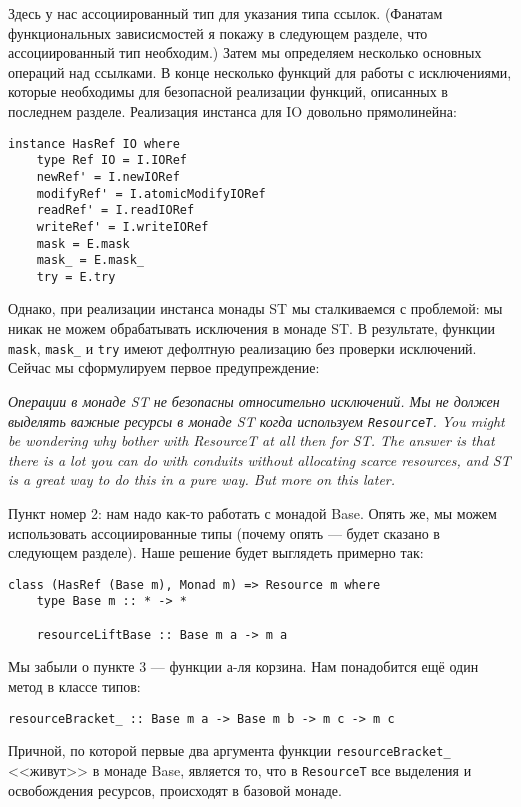 Здесь у нас ассоциированный тип для указания типа ссылок. (Фанатам функциональных 
зависисмостей я покажу в следующем разделе, что ассоциированный тип необходим.) 
Затем мы определяем несколько основных операций над ссылками.
В конце несколько функций для работы с
исключениями, которые необходимы для безопасной реализации функций, описанных в
последнем разделе. Реализация инстанса для IO довольно прямолинейна:
  
\begin{lstlisting}
instance HasRef IO where
    type Ref IO = I.IORef
    newRef' = I.newIORef
    modifyRef' = I.atomicModifyIORef
    readRef' = I.readIORef
    writeRef' = I.writeIORef
    mask = E.mask
    mask_ = E.mask_
    try = E.try 
\end{lstlisting}
Однако, при реализации инстанса монады ST мы сталкиваемся с проблемой: мы никак не можем
обрабатывать исключения в монаде ST. В результате, функции \lstinline'mask',
\lstinline'mask_' и \lstinline'try' имеют
дефолтную реализацию без проверки исключений. Сейчас мы сформулируем первое
предупреждение:

\textit{Операции в монаде ST не безопасны относительно исключений. Мы не должен выделять
важные ресурсы в монаде ST когда используем \lstinline'ResourceT'. You might be wondering
why bother
with
ResourceT at all then for ST. The answer is that there is a
lot you can do with conduits without allocating scarce resources, and ST is a
great way to do this in a pure way. But more on this later. 
}


Пункт номер 2: нам надо как-то работать с монадой Base. Опять же, мы можем
использовать ассоциированные типы (почему опять --- будет сказано в следующем разделе). 
Наше решение будет выглядеть примерно так:
\begin{lstlisting}
class (HasRef (Base m), Monad m) => Resource m where
    type Base m :: * -> *

    resourceLiftBase :: Base m a -> m a 
\end{lstlisting}
Мы забыли о пункте 3 --- функции а-ля корзина. Нам понадобится ещё один метод в классе
типов:
\begin{lstlisting}
resourceBracket_ :: Base m a -> Base m b -> m c -> m c 
\end{lstlisting}
Причной, по которой первые два аргумента функции \lstinline'resourceBracket_' <<живут>> в
монаде Base, является то, что в \lstinline'ResourceT' все выделения и освобождения
ресурсов, происходят в базовой монаде.

